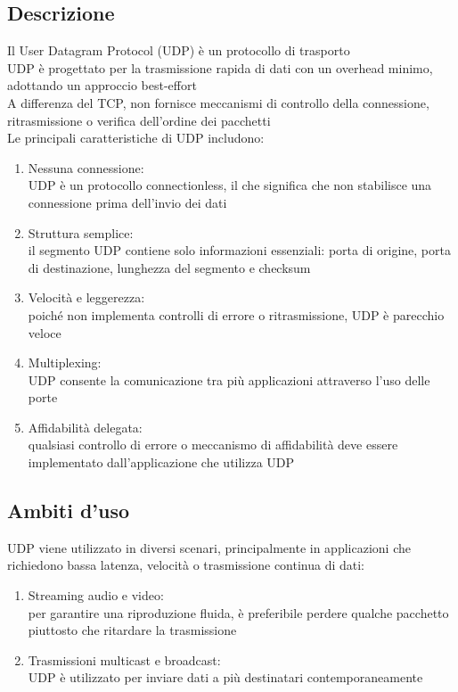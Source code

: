 \documentclass[10pt,oneside,a4paper]{article}
\begin{document}
\subsection{Descrizione}
Il User Datagram Protocol (UDP) è un protocollo di trasporto\\
UDP è progettato per la trasmissione rapida di dati con un overhead minimo, adottando un approccio best-effort\\
A differenza del TCP, non fornisce meccanismi di controllo della connessione, ritrasmissione o verifica dell'ordine dei pacchetti\\
Le principali caratteristiche di UDP includono:
\begin{enumerate}
\item Nessuna connessione:\\
UDP è un protocollo connectionless, il che significa che non stabilisce una connessione prima dell'invio dei dati
\item Struttura semplice:\\
il segmento UDP contiene solo informazioni essenziali: porta di origine, porta di destinazione, lunghezza del segmento e checksum
\item Velocità e leggerezza:\\
poiché non implementa controlli di errore o ritrasmissione, UDP è parecchio veloce
\item Multiplexing:\\
UDP consente la comunicazione tra più applicazioni attraverso l'uso delle porte
\item Affidabilità delegata:\\
qualsiasi controllo di errore o meccanismo di affidabilità deve essere implementato dall'applicazione che utilizza UDP
\end{enumerate}
\subsection{Ambiti d'uso}
UDP viene utilizzato in diversi scenari, principalmente in applicazioni che richiedono bassa latenza, velocità o trasmissione continua di dati:
\begin{enumerate}
\item Streaming audio e video:\\
per garantire una riproduzione fluida, è preferibile perdere qualche pacchetto piuttosto che ritardare la trasmissione
\item Trasmissioni multicast e broadcast:\\
UDP è utilizzato per inviare dati a più destinatari contemporaneamente
\end{enumerate}
\end{document}
